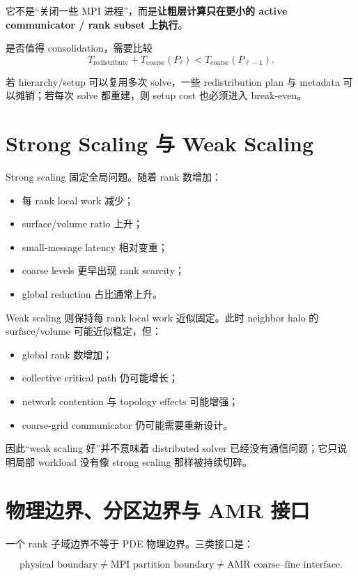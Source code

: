 它不是“关闭一些 MPI 进程”，而是\textbf{让粗层计算只在更小的 active communicator / rank subset 上执行}。

是否值得 consolidation，需要比较
\begin{equation}
\boxed{
T_{\mathrm{redistribute}}
+
T_{\mathrm{coarse}}(P_\ell)
<
T_{\mathrm{coarse}}(P_{\ell-1}).
}
\label{eq:mpi-consolidation-break-even}
\end{equation}

若 hierarchy/setup 可以复用多次 solve，一些 redistribution plan 与 metadata 可以摊销；若每次 solve 都重建，则 setup cost 也必须进入 break-even。

\section{Strong Scaling 与 Weak Scaling}

Strong scaling 固定全局问题。随着 rank 数增加：
\begin{itemize}
\item 每 rank local work 减少；
\item surface/volume ratio 上升；
\item small-message latency 相对变重；
\item coarse levels 更早出现 rank scarcity；
\item global reduction 占比通常上升。
\end{itemize}

Weak scaling 则保持每 rank local work 近似固定。此时 neighbor halo 的 surface/volume 可能近似稳定，但：
\begin{itemize}
\item global rank 数增加；
\item collective critical path 仍可能增长；
\item network contention 与 topology effects 可能增强；
\item coarse-grid communicator 仍可能需要重新设计。
\end{itemize}

因此“weak scaling 好”并不意味着 distributed solver 已经没有通信问题；它只说明局部 workload 没有像 strong scaling 那样被持续切碎。

\section{物理边界、分区边界与 AMR 接口}

一个 rank 子域边界不等于 PDE 物理边界。三类接口是：

\begin{equation}
\boxed{
\text{physical boundary}
\neq
\text{MPI partition boundary}
\neq
\text{AMR coarse--fine interface}.
}
\label{eq:mpi-boundary-classes}
\end{equation}


